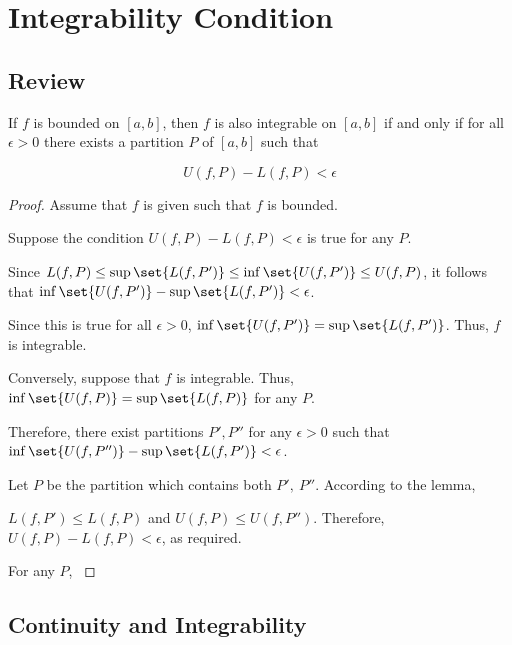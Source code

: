 \documentclass[11pt]{scrartcl}
\begin{document}
\section{Integrability Condition}
\label{sec:alg}

\subsection{Review}
\label{subsec:rev}


\begin{theorem}
  If \(f\) is bounded on \([a, b]\), then \(f\) is also integrable on
  \([a,b]\) if and only if for all \( \epsilon > 0\) there exists a
  partition \(P\) of \([a, b]\) such that

  \begin{equation*}
    U(f, P) - L(f, P) < \epsilon
  \end{equation*}

\end{theorem}


\begin{proof}


  Assume that \(f\) is given such that \(f\) is bounded.

  Suppose the condition \(  U(f, P) - L(f, P) < \epsilon\) is true for any \(P\).

  Since
  \(L(f, P) \leq \sup \set{L(f, P')} \leq \inf\set{U(f, P')}\leq U(f,
  P)\), it follows that
  \(\inf\set{U(f, P')} - \sup\set{L(f, P')} < \epsilon\).

  Since this is true for all \(\epsilon>0\),
  \(\inf\set{U(f, P')} = \sup\set{L(f, P')}\). Thus, \(f\) is
  integrable.

  Conversely, suppose that \(f\) is integrable. Thus,
  \(\inf\set{U(f, P)} = \sup\set{L(f, P)}\) for any \(P\).

  Therefore, there exist partitions \(P', P''\) for any \(\epsilon>0\)
  such that \(\inf\set{U(f, P'')} - \sup\set{L(f, P')} < \epsilon\).

  Let \(P\) be the partition which contains both \(P',\ P''\). According to the lemma,

  \(L(f, P') \leq L(f, P)\) and \(U(f, P) \leq U(f, P'')\). Therefore,
  \(U(f, P) - L(f, P) < \epsilon\), as required.

  For any \(P\), \(\)
\end{proof}

\subsection{Continuity and Integrability}
\label{subsec:cont}
\end{document}
